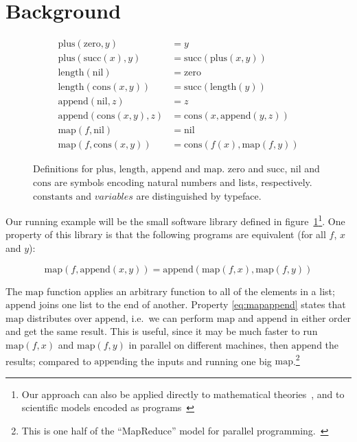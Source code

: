 \documentclass[]{default}
\newcommand{\name}[1]{\mathrm{#1}}
\begin{document}
\section{Background}\label{background}

\begin{figure}
  \begin{equation*}
    \begin{aligned}
      \name{plus}(\name{zero},         y) &= y                                   \\
      \name{plus}(\name{succ}(x),      y) &= \name{succ}(\name{plus}(x, y))      \\
      \name{length}(\name{nil})           &= \name{zero}                         \\
      \name{length}(\name{cons}(x, y))    &= \name{succ}(\name{length}(y))       \\
      \name{append}(\name{nil},        z) &= z                                   \\
      \name{append}(\name{cons}(x,y),  z) &= \name{cons}(x, \name{append}(y, z)) \\
      \name{map}(f,           \name{nil}) &= \name{nil}                          \\
      \name{map}(f,    \name{cons}(x, y)) &= \name{cons}(f(x), \name{map}(f, y))
    \end{aligned}
  \end{equation*}
  \caption{Definitions for $\name{plus}$, $\name{length}$, $\name{append}$ and
    $\name{map}$. $\name{zero}$ and $\name{succ}$, $\name{nil}$ and
    $\name{cons}$ are symbols encoding natural numbers and lists, respectively.
    $\name{constants}$ and $variables$ are distinguished by
    typeface.}\label{fig:defs}
\end{figure}

Our running example will be the small software library defined in
figure~\ref{fig:defs}\footnote{Our approach can also be applied directly to
  mathematical theories~\cite{wadler2015propositions}, and to scientific models
  encoded as programs~\cite{davies1990physical}}. One property of this library
is that the following programs are equivalent (for all $f$, $x$ and $y$):

\begin{equation}\label{eq:mapappend}
  \name{map}(f, \name{append}(x, y)) =
    \name{append}(\name{map}(f, x), \name{map}(f, y))
\end{equation}

The $\name{map}$ function applies an arbitrary function to all of the elements
in a list; $\name{append}$ joins one list to the end of another. Property
\ref{eq:mapappend} states that $\name{map}$ distributes over $\name{append}$,
i.e.\ we can perform $\name{map}$ and $\name{append}$ in either order and get
the same result. This is useful, since it may be much faster to run
$\name{map}(f, x)$ and $\name{map}(f, y)$ in parallel on different machines,
then $\name{append}$ the results; compared to $\name{append}$ing the inputs and
running one big $\name{map}$.\footnote{This is one half of the ``MapReduce''
  model for parallel programming.~\cite{dean2008mapreduce}}
\end{document}
